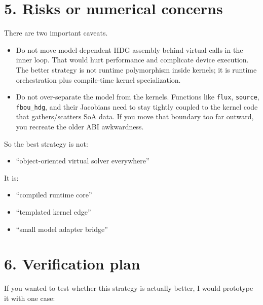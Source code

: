 \documentclass[11pt]{article}
\begin{document}
\section*{5. Risks or numerical concerns}

There are two important caveats.

\begin{itemize}[leftmargin=*]
\item Do not move model-dependent HDG assembly behind virtual calls in the inner loop. That would hurt performance and complicate device execution. The better strategy is not runtime polymorphism inside kernels; it is runtime orchestration plus compile-time kernel specialization.
\item Do not over-separate the model from the kernels. Functions like \texttt{flux}, \texttt{source}, \texttt{fbou\_hdg}, and their Jacobians need to stay tightly coupled to the kernel code that gathers/scatters SoA data. If you move that boundary too far outward, you recreate the older ABI awkwardness.
\end{itemize}

So the best strategy is not:

\begin{itemize}[leftmargin=*]
\item ``object-oriented virtual solver everywhere''
\end{itemize}

It is:

\begin{itemize}[leftmargin=*]
\item ``compiled runtime core''
\item ``templated kernel edge''
\item ``small model adapter bridge''
\end{itemize}

\section*{6. Verification plan}

If you wanted to test whether this strategy is actually better, I would prototype it with one case:
\end{document}

